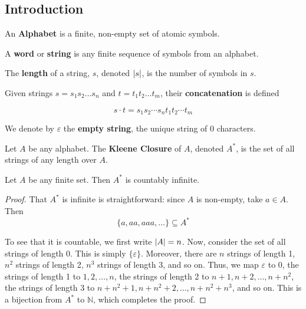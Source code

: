 \subsection{Introduction}\label{subsubsec:introduction}
\begin{definition}
 An \textbf{Alphabet} is a finite, non-empty set of atomic symbols.
\end{definition}

\begin{definition}
 A \textbf{word} or \textbf{string} is any finite sequence of symbols from an alphabet. 
\end{definition}

\begin{definition}
 The \textbf{length} of a string, \(s\), denoted \(\abs{s}\), is the number of symbols in \(s\). 
\end{definition}

\begin{definition}
 Given strings \(s=s_1s_2\hdots s_n\) and \(t=t_1t_2\hdots t_m\), their \textbf{concatenation} is defined 
 
 \[s\cdot t=s_1s_2\cdots s_n t_1t_2\cdots t_m\]
\end{definition}

We denote by \(\varepsilon \) the \textbf{empty string}, the unique string of 0 characters. 

\begin{definition}
 Let \(A\) be any alphabet. The \textbf{Kleene Closure} of \(A\), denoted \(A^*\), is the set of all strings of any length over \(A\).  
\end{definition}

\begin{theorem}
 Let \(A\) be any finite set. Then \(A^*\) is countably infinite. 
\end{theorem}

\begin{proof}
 That \(A^*\) is infinite is straightforward: since \(A\) is non-empty, take \(a\in A\). Then \[ \{a, aa, aaa, \hdots \}\subseteq A^*\]
 
 To see that it is countable, we first write \(\abs{A}=n\). Now, consider the set of all strings of length 0. This is simply \( \{\varepsilon \} \). Moreover, there are \(n\) strings of length 1, \(n^2\) strings of length 2, \(n^3\) strings of length 3, and so on. Thus, we map \(\varepsilon \) to 0, the strings of length 1 to \(1, 2, \hdots, n\), the strings of length 2 to \(n+1, n+2, \hdots, n+n^2\), the strings of length 3 to \(n+n^2+1, n+n^2+2,\hdots, n+n^2+n^3\), and so on. This is a bijection from \(A^*\) to \(\mathbb{N}\), which completes the proof.
\end{proof}


